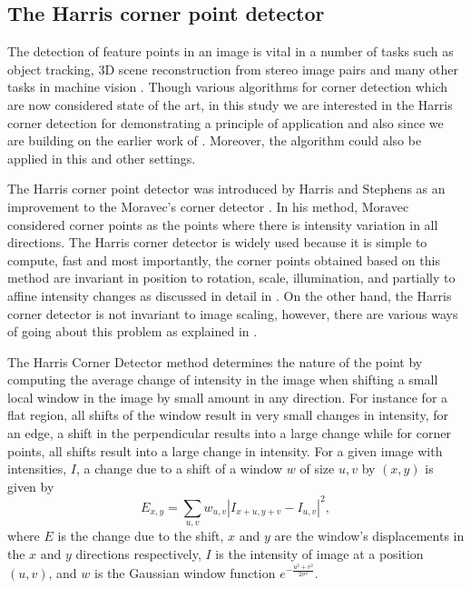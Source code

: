 \documentclass[10pt,a4paper]{article}
\theoremstyle{plain}
\theoremstyle{definition}
\begin{document}
     \subsection{The Harris corner point detector}
     The detection of feature points in an image is vital in a number of tasks such as object tracking, $3$D scene reconstruction from stereo image pairs and many other tasks in machine vision \citep{trajkovic1998fast}. Though various algorithms for corner detection which are now considered state of the art, in this study we are interested in the Harris corner detection for demonstrating a principle of application and also since we are building on the earlier work of \citep{xiao2009graph,stoica2011delaunay}. Moreover, the algorithm could also be applied in this and other settings.
     
     The Harris corner point detector was introduced by Harris and Stephens \citep{harris1988combined} as an improvement to the Moravec's corner detector \citep{moravec1979visual,moravec1980obstacle}. In his method, Moravec considered corner points as the points where there is intensity variation in all directions. The Harris corner detector is widely used because it is simple to compute, fast and most importantly, the corner points obtained based on this method are invariant in position to rotation, scale, illumination, and partially to affine intensity changes as discussed in detail in \citep{stoica2011delaunay}. On the other hand, the Harris corner detector is not invariant to image scaling, however, there are various ways of going about this problem as explained in \citep{stoica2011delaunay}.
     
     The Harris Corner Detector method determines the nature of the point by computing the average change of intensity in the image when shifting a small local window in the image by small amount in any direction. For instance for a flat region, all shifts of the window result in very small changes in intensity, for an edge, a shift in the perpendicular results into a large change while for corner points, all shifts result into a large change in intensity. For a given image with intensities, $I$, a change due to a shift of a window $w$ of size $u,v$ by $(x,y)$ is given by \citep{stoica2011delaunay}
     \begin{equation}
     E_{x,y} = \sum_{u,v} w_{u,v} |I_{x+u, y+v} - I_{u,v}|^2,
     \end{equation}
     where $E$ is the change due to the shift, $x$ and $y$ are the window's displacements in the $x$ and $y$ directions respectively, $I$ is the intensity of image at a position $(u,v)$, and $w$ is the Gaussian window function  $e^{-\frac{u^2 + v^2}{2 \sigma^2}}$.
     
\end{document}
